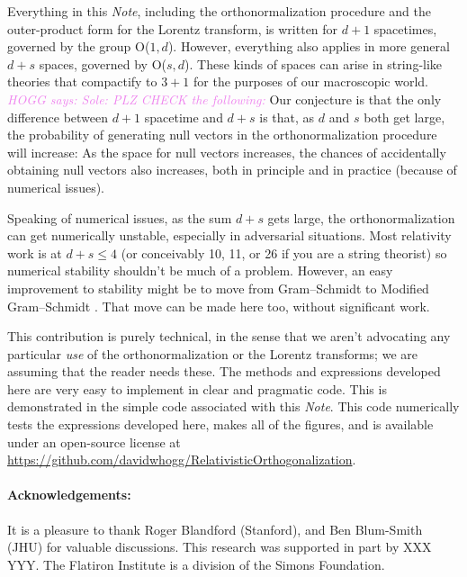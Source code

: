 \documentclass{article}
\newcommand{\plus}{\!+\!} %
\newcommand{\documentname}{\textsl{Note}}
\newcommand{\HOGG}[1]{\textcolor{violet}{\textsl{HOGG says: {#1}}}}
\begin{document}
Everything in this \documentname{}, including the orthonormalization procedure and the outer-product form for the Lorentz transform, is written for $d\plus1$ spacetimes, governed by the group O($1,d$).
However, everything also applies in more general $d\plus s$ spaces, governed by O($s,d$).
These kinds of spaces can arise in string-like theories that compactify to $3\plus 1$ for the purposes of our macroscopic world.
\HOGG{Sole: PLZ CHECK the following:}
Our conjecture is that the only difference between $d\plus1$ spacetime and $d\plus s$ is that, as $d$ and $s$ both get large, the probability of generating null vectors in the orthonormalization procedure will increase:
As the space for null vectors increases, the chances of accidentally obtaining null vectors also increases, both in principle and in practice (because of numerical issues).

Speaking of numerical issues, as the sum $d+s$ gets large, the orthonormalization can get numerically unstable, especially in adversarial situations.
Most relativity work is at $d+s\leq 4$ (or conceivably 10, 11, or 26 if you are a string theorist) so numerical stability shouldn't be much of a problem.
However, an easy improvement to stability might be to move from Gram--Schmidt to Modified Gram--Schmidt \cite{modifiedgramschmidt}.
That move can be made here too, without significant work.

This contribution is purely technical, in the sense that we aren't advocating any particular \emph{use} of the orthonormalization or the Lorentz transforms; we are assuming that the reader needs these.
The methods and expressions developed here are very easy to implement in clear and pragmatic code.
This is demonstrated in the simple code associated with this \documentname.
This code numerically tests the expressions developed here, makes all of the figures, and is available under an open-source license at \url{https://github.com/davidwhogg/RelativisticOrthogonalization}.

\paragraph{Acknowledgements:}
It is a pleasure to thank
  Roger Blandford (Stanford), and
  Ben Blum-Smith (JHU)
for valuable discussions.
This research was supported in part by XXX YYY.
The Flatiron Institute is a division of the Simons Foundation.

\raggedright


\end{document}
